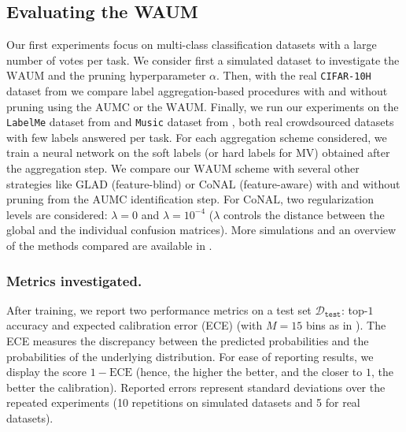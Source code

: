 \subsection{Evaluating the WAUM}
\label{subsec:evaluate}

Our first experiments focus on multi-class classification datasets with a large number of votes per task.
We consider first a simulated dataset to investigate the $\mathrm{WAUM}$ and the pruning hyperparameter $\alpha$.
Then, with the real \texttt{CIFAR-10H} dataset from \citet{peterson_human_2019} we compare label aggregation-based procedures with and without pruning using the $\mathrm{AUMC}$ or the $\mathrm{WAUM}$.
Finally, we run our experiments on the \texttt{LabelMe} dataset from \citet{rodrigues2018deep} and \texttt{Music} dataset from \citet{rodrigues2014gaussian}, both real crowdsourced datasets with few labels answered per task.
For each aggregation scheme considered, we train a neural network on the soft labels (or hard labels for MV) obtained after the aggregation step.
We compare our $\mathrm{WAUM}$ scheme with several other strategies like $\mathrm{GLAD}$ (feature-blind) or $\mathrm{CoNAL}$ (feature-aware) with and without pruning from the $\mathrm{AUMC}$ identification step.
For $\mathrm{CoNAL}$, two regularization levels are considered: $\lambda=0$ and $\lambda=10^{-4}$ ($\lambda$ controls the distance between the global and the individual confusion matrices).
More simulations and an overview of the methods compared are available in .

\subsubsection*{Metrics investigated.}
After training, we report two performance metrics on a test set $\mathcal{D}_{\texttt{test}}$: top-$1$ accuracy and expected calibration error (ECE) (with $M=15$ bins as in \citet{guo_calibration_2017}).
The ECE measures the discrepancy between the predicted probabilities and the probabilities of the underlying distribution.
For ease of reporting results, we display the score $1-\mathrm{ECE}$ (hence, the higher the better, and the closer to $1$, the better the calibration).
Reported errors represent standard deviations over the repeated experiments (10 repetitions on simulated datasets and 5 for real datasets).

